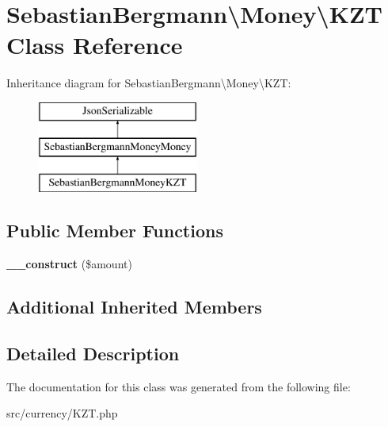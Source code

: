 \hypertarget{classSebastianBergmann_1_1Money_1_1KZT}{}\section{Sebastian\+Bergmann\textbackslash{}Money\textbackslash{}K\+Z\+T Class Reference}
\label{classSebastianBergmann_1_1Money_1_1KZT}
Inheritance diagram for Sebastian\+Bergmann\textbackslash{}Money\textbackslash{}K\+Z\+T\+:\begin{figure}[H]
\begin{center}
\leavevmode
\includegraphics[height=3.000000cm]{classSebastianBergmann_1_1Money_1_1KZT}
\end{center}
\end{figure}
\subsection*{Public Member Functions}
\begin{DoxyCompactItemize}
\item 
\hypertarget{classSebastianBergmann_1_1Money_1_1KZT_a86329cedd456afe9f18ece13bb5e574f}{}{\bfseries \+\_\+\+\_\+construct} (\$amount)\label{classSebastianBergmann_1_1Money_1_1KZT_a86329cedd456afe9f18ece13bb5e574f}

\end{DoxyCompactItemize}
\subsection*{Additional Inherited Members}


\subsection{Detailed Description}


The documentation for this class was generated from the following file\+:\begin{DoxyCompactItemize}
\item 
src/currency/K\+Z\+T.\+php\end{DoxyCompactItemize}

